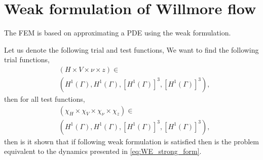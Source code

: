 \section{Weak formulation of Willmore flow}%
\label{sub:weak_formulation}

The FEM is based on approximating a PDE using the weak formulation.

Let us denote the following trial and test functions,
We want to find the following trial functions,
\[
    \begin{split}
& ( H \times V \times \nu  \times z ) \in \\
&\left( H^{1}\left( \Gamma  \right), H^1 \left( \Gamma  \right), \left[ H^{1} \left( \Gamma  \right)  \right] ^3, \left[ H^{1}\left( \Gamma  \right)  \right]^3   \right),
    \end{split}
\]
then for all test functions,
\[
    \begin{split}
& ( \chi_{H}  \times \chi _{V} \times \chi _{\nu }  \times \chi _{z} ) \in \\
 &\left( H^{1}\left( \Gamma  \right), H^1 \left( \Gamma  \right), \left[ H^{1} \left( \Gamma  \right)  \right] ^3, \left[ H^{1}\left( \Gamma  \right)  \right]^3   \right),
    \end{split}
\]
 then is it shown that if following weak formulation is satisfied then is the problem equivalent to the dynamics presented in \eqref{eq:WE_strong_form}.

